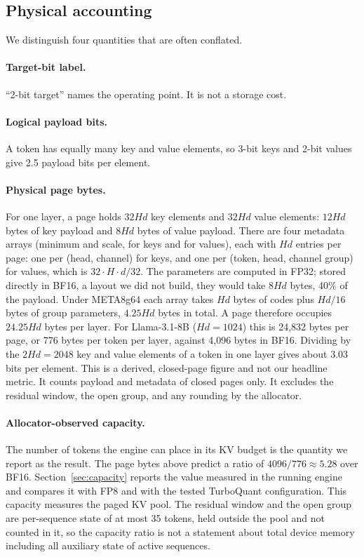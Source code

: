 \documentclass{article}
\begin{document}
\subsection{Physical accounting}

We distinguish four quantities that are often conflated.

\paragraph{Target-bit label.}
``2-bit target'' names the operating point. It is not a storage cost.

\paragraph{Logical payload bits.}
A token has equally many key and value elements, so 3-bit keys and 2-bit values give 2.5 payload bits
per element.

\paragraph{Physical page bytes.}
For one layer, a page holds $32Hd$ key elements and $32Hd$ value elements: $12Hd$ bytes of key payload
and $8Hd$ bytes of value payload. There are four metadata arrays (minimum and scale, for keys and for
values), each with $Hd$ entries per page: one per (head, channel) for keys, and one per (token, head,
channel group) for values, which is $32 \cdot H \cdot d/32$. The parameters are computed in FP32;
stored directly in BF16, a layout we did not build, they would take
$8Hd$ bytes, 40\% of the payload. Under META8g64 each array takes $Hd$ bytes of codes plus $Hd/16$ bytes
of group parameters, $4.25Hd$ bytes in total. A page therefore occupies $24.25Hd$ bytes per layer. For
Llama-3.1-8B ($Hd=1024$) this is 24,832 bytes per page, or 776 bytes per token per layer, against 4,096
bytes in BF16. Dividing by the $2Hd=2048$ key and value elements of a token in one layer gives about 3.03 bits per
element. This is a derived, closed-page figure and not our headline metric. It counts payload and
metadata of closed pages only. It excludes the residual window, the open group, and any rounding by
the allocator.

\paragraph{Allocator-observed capacity.}
The number of tokens the engine can place in its KV budget is the quantity we report as the result. The
page bytes above predict a ratio of $4096/776 \approx 5.28$ over BF16. Section~\ref{sec:capacity} reports the value
measured in the running engine and compares it with FP8 and with the tested TurboQuant configuration.
This capacity measures the paged KV pool. The residual window and the open group are per-sequence
state of at most 35 tokens, held outside the pool and not counted in it, so the capacity ratio is not
a statement about total device memory including all auxiliary state of active sequences.
\end{document}
